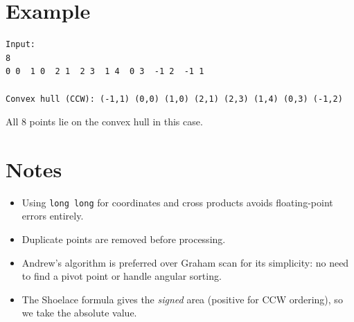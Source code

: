\documentclass[11pt,a4paper]{article}
\begin{document}
\section{Example}

\begin{verbatim}
Input:
8
0 0  1 0  2 1  2 3  1 4  0 3  -1 2  -1 1

Convex hull (CCW): (-1,1) (0,0) (1,0) (2,1) (2,3) (1,4) (0,3) (-1,2)
\end{verbatim}

All 8 points lie on the convex hull in this case.

\section{Notes}

\begin{itemize}
  \item Using \texttt{long long} for coordinates and cross products avoids
    floating-point errors entirely.
  \item Duplicate points are removed before processing.
  \item Andrew's algorithm is preferred over Graham scan for its simplicity:
    no need to find a pivot point or handle angular sorting.
  \item The Shoelace formula gives the \emph{signed} area (positive for CCW
    ordering), so we take the absolute value.
\end{itemize}
\end{document}
